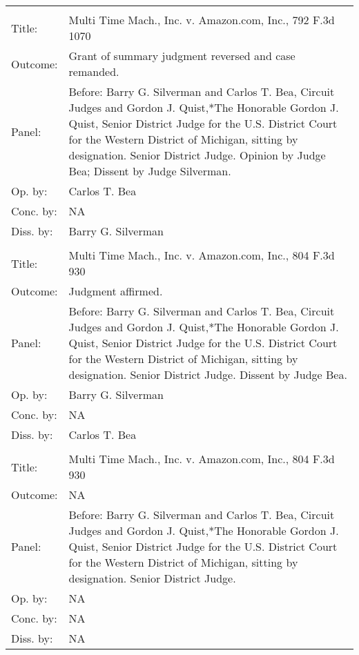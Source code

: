 \documentclass[10pt, letterpaper]{article}
\begin{document}
\begin{spacing}{1.0}
\begin{footnotesize}
\begin{longtable}[H]{lp{6in}}
        \arrayrulecolor{black}\hline\\[-4pt]
        Title: & Multi Time Mach., Inc. v. Amazon.com, Inc., 792 F.3d 1070\\[2pt]
        Outcome: & Grant of summary judgment reversed and case remanded.\\[2pt]
        Panel: & Before: Barry G. Silverman and Carlos T. Bea, Circuit Judges and Gordon J. Quist,*The Honorable Gordon J. Quist, Senior District Judge for the U.S. District Court for the Western District of Michigan, sitting by designation. Senior District Judge. Opinion by Judge Bea; Dissent by Judge Silverman.\\[2pt]
        Op. by: & Carlos T. Bea\\[2pt]
        Conc. by: & NA\\[2pt]
        Diss. by: & Barry G. Silverman\\[2pt]
        \arrayrulecolor{gray}\hline\\[-4pt]
        Title: & Multi Time Mach., Inc. v. Amazon.com, Inc., 804 F.3d 930\\[2pt]
        Outcome: & Judgment affirmed.\\[2pt]
        Panel: & Before: Barry G. Silverman and Carlos T. Bea, Circuit Judges and Gordon J. Quist,*The Honorable Gordon J. Quist, Senior District Judge for the U.S. District Court for the Western District of Michigan, sitting by designation. Senior District Judge. Dissent by Judge Bea.\\[2pt]
        Op. by: & Barry G. Silverman\\[2pt]
        Conc. by: & NA\\[2pt]
        Diss. by: & Carlos T. Bea\\[2pt]
        \arrayrulecolor{gray}\hline\\[-4pt]
        Title: & Multi Time Mach., Inc. v. Amazon.com, Inc., 804 F.3d 930\\[2pt]
        Outcome: & NA\\[2pt]
        Panel: & Before: Barry G. Silverman and Carlos T. Bea, Circuit Judges and Gordon J. Quist,*The Honorable Gordon J. Quist, Senior District Judge for the U.S. District Court for the Western District of Michigan, sitting by designation. Senior District Judge.\\[2pt]
        Op. by: & NA\\[2pt]
        Conc. by: & NA\\[2pt]
        Diss. by: & NA\\[2pt]
        

\end{longtable}
\end{footnotesize}
\end{spacing}
\end{document}
